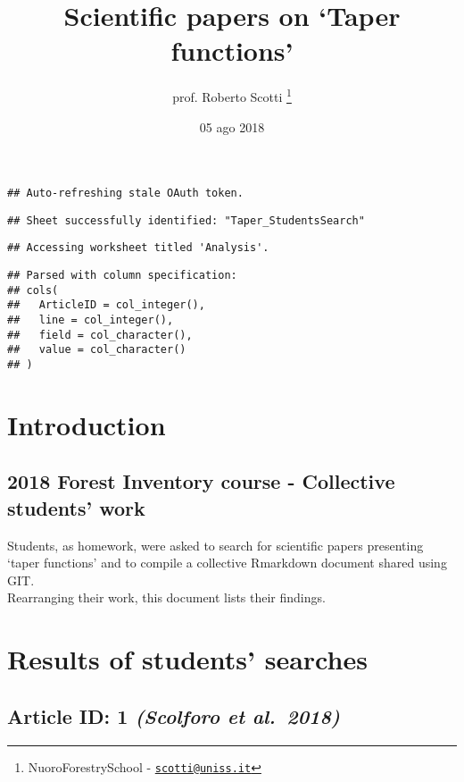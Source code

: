 \documentclass[]{article}
\title{Scientific papers on `Taper functions'}
\author{prof. Roberto Scotti \footnote{NuoroForestrySchool -
  \href{mailto:scotti@uniss.it}{\nolinkurl{scotti@uniss.it}}}}
\date{05 ago 2018}
\begin{document}
\maketitle

\begin{verbatim}
## Auto-refreshing stale OAuth token.
\end{verbatim}

\begin{verbatim}
## Sheet successfully identified: "Taper_StudentsSearch"
\end{verbatim}

\begin{verbatim}
## Accessing worksheet titled 'Analysis'.
\end{verbatim}

\begin{verbatim}
## Parsed with column specification:
## cols(
##   ArticleID = col_integer(),
##   line = col_integer(),
##   field = col_character(),
##   value = col_character()
## )
\end{verbatim}

\hypertarget{introduction}{%
\section{Introduction}\label{introduction}}

\hypertarget{forest-inventory-course---collective-students-work}{%
\subsection{2018 Forest Inventory course - Collective students'
work}\label{forest-inventory-course---collective-students-work}}

Students, as homework, were asked to search for scientific papers
presenting `taper functions' and to compile a collective Rmarkdown
document shared using GIT.\\
Rearranging their work, this document lists their findings.

\hypertarget{results-of-students-searches}{%
\section{Results of students'
searches}\label{results-of-students-searches}}

\hypertarget{article-id-1-scolforo-et-al.2018}{%
\subsection{\texorpdfstring{Article ID: 1 \textbf{\emph{(Scolforo et
al.~2018)}}}{Article ID: 1 (Scolforo et al.~2018)}}\label{article-id-1-scolforo-et-al.2018}}
\end{document}
